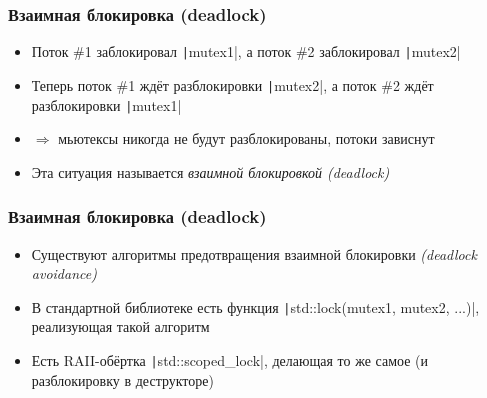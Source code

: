 \documentclass[10pt]{beamer}
\begin{document}
\begin{frame}[fragile]
\frametitle{Взаимная блокировка (deadlock)}
\begin{itemize}
\begin{multicols}{2}
\columnbreak
{}
\end{multicols}
\pause
{}
\item Поток \#1 заблокировал \texttt|mutex1|, а поток \#2 заблокировал \texttt|mutex2|
\pause
\item Теперь поток \#1 ждёт разблокировки \texttt|mutex2|, а поток \#2 ждёт разблокировки \texttt|mutex1|
\pause
\item \(\Longrightarrow\) мьютексы никогда не будут разблокированы, потоки зависнут
\pause
\item Эта ситуация называется \textit{взаимной блокировкой (deadlock)}
\end{itemize}
\end{frame}

\begin{frame}[fragile]
\frametitle{Взаимная блокировка (deadlock)}
\begin{itemize}
\item Существуют алгоритмы предотвращения взаимной блокировки \textit{(deadlock avoidance)}
\pause
\item В стандартной библиотеке есть функция \texttt|std::lock(mutex1, mutex2, ...)|, реализующая такой алгоритм
\pause
\item Есть RAII-обёртка \texttt|std::scoped_lock|, делающая то же самое (и разблокировку в деструкторе)
\end{itemize}
\end{frame}
\end{document}
